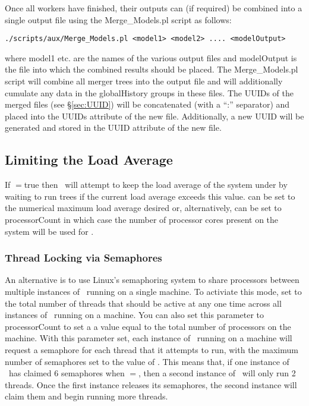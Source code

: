 Once all workers have finished, their outputs can (if required) be combined into a single output file using the {\normalfont \ttfamily Merge\_Models.pl} script as follows:
\begin{verbatim}
./scripts/aux/Merge_Models.pl <model1> <model2> .... <modelOutput>
\end{verbatim}
where {\normalfont \ttfamily model1} etc. are the names of the various output files and {\normalfont \ttfamily modelOutput} is the file into which the combined results should be placed. The {\normalfont \ttfamily Merge\_Models.pl} script will combine all merger trees into the output file and will additionally cumulate any data in the {\normalfont \ttfamily globalHistory} groups in these files. The UUIDs of the merged files (see \S\ref{sec:UUID}) will be concatenated (with a ``:'' separator) and placed into the {\normalfont \ttfamily UUIDs} attribute of the new file. Additionally, a new UUID will be generated and stored in the {\normalfont \ttfamily UUID} attribute of the new file.

\subsection{Limiting the Load Average}

If {\normalfont \ttfamily [treeEvolveLimitLoadAverage]}$=${\normalfont \ttfamily true} then \glc\ will attempt to keep the load average of the system under {\normalfont \ttfamily [treeEvolveLoadAverageMaximum]} by waiting to run trees if the current load average exceeds this value. {\normalfont \ttfamily [treeEvolveLoadAverageMaximum]} can be set to the numerical maximum load average desired or, alternatively, can be set to {\normalfont \ttfamily processorCount} in which case the number of processor cores present on the system will be used for {\normalfont \ttfamily [treeEvolveLoadAverageMaximum]}.

\subsubsection{Thread Locking via Semaphores}\label{sec:Semaphores}

An alternative is to use Linux's semaphoring system to share processors between multiple instances of \glc\ running on a single machine. To activiate this mode, set {\normalfont \ttfamily [treeEvolveThreadLock]} to the total number of threads that should be active at any one time across all instances of \glc\ running on a machine. You can also set this parameter to {\normalfont \ttfamily processorCount} to set a a value equal to the total number of processors on the machine. With this parameter set, each instance of \glc\ running on a machine will request a semaphore for each thread that it attempts to run, with the maximum number of semaphores set to the value of {\normalfont \ttfamily [treeEvolveThreadLock]}. This means that, if one instance of \glc\ has claimed 6 semaphores when {\normalfont \ttfamily [treeEvolveThreadLock]}$=${\normalfont {}}, then a second instance of \glc\ will only run 2 threads. Once the first instance releases its semaphores, the second instance will claim them and begin running more threads.

